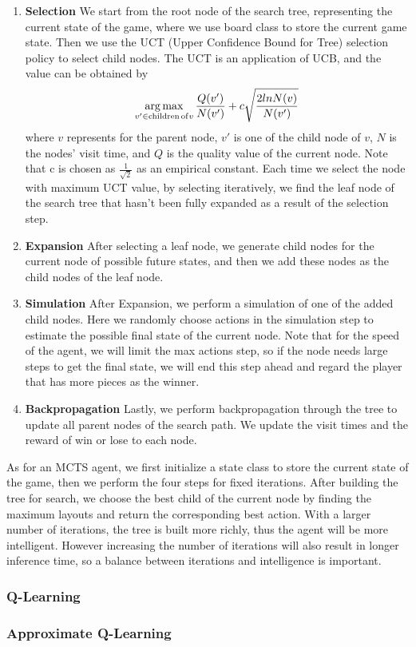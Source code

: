 \begin{enumerate}
    \item \textbf{Selection} We start from the root node of the search tree, representing the current state of the game, where we use board class to store the current game state. Then we use the UCT (Upper Confidence Bound for Tree) selection policy to select child nodes. The UCT is an application of UCB, and the value can be obtained by $$\mathop{\arg\max}\limits_{v' \in {\rm children \, of} v} \dfrac{Q(v')}{N(v')} + c \sqrt{\dfrac{2 lnN(v)}{N(v')}}$$ where $v$ represents for the parent node, $v'$ is one of the child node of $v$, $N$ is the nodes' visit time, and $Q$ is the quality value of the current node. Note that c is chosen as $\frac{1}{\sqrt{2}}$ as an empirical constant. Each time we select the node with maximum UCT value, by selecting iteratively, we find the leaf node of the search tree that hasn't been fully expanded as a result of the selection step. 
    \item \textbf{Expansion} After selecting a leaf node, we generate child nodes for the current node of possible future states, and then we add these nodes as the child nodes of the leaf node. 
    \item \textbf{Simulation} After Expansion, we perform a simulation of one of the added child nodes. Here we randomly choose actions in the simulation step to estimate the possible final state of the current node. Note that for the speed of the agent, we will limit the max actions step, so if the node needs large steps to get the final state, we will end this step ahead and regard the player that has more pieces as the winner. 
    \item \textbf{Backpropagation} Lastly, we perform backpropagation through the tree to update all parent nodes of the search path. We update the visit times and the reward of win or lose to each node.
\end{enumerate}
As for an MCTS agent, we first initialize a state class to store the current state of the game, then we perform the four steps for fixed iterations. After building the tree for search, we choose the best child of the current node by finding the maximum layouts and return the corresponding best action. With a larger number of iterations, the tree is built more richly, thus the agent will be more intelligent. However increasing the number of iterations will also result in longer inference time, so a balance between iterations and intelligence is important. 

\subsubsection{Q-Learning}
\subsubsection{Approximate Q-Learning}